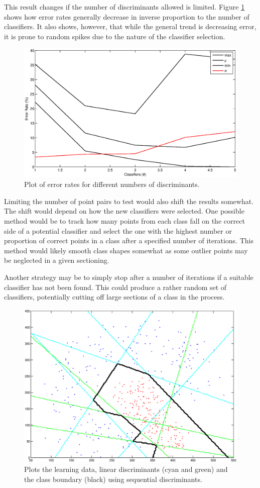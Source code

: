 This result changes if the number of discriminants allowed is limited. Figure
\ref{fig:error_rates} shows how error rates generally decrease in inverse
proportion to the number of classifiers. It also shows, however, that while the
general trend is decreasing error, it is prone to random spikes due to the
nature of the classifier selection.

\begin{figure}
\includegraphics[scale=0.6]{sequence_error_plots}
\caption{Plot of error rates for different numbers of discriminants.}
\label{fig:error_rates}
\end{figure}

Limiting the number of point pairs to test would also shift the results
somewhat. The shift would depend on how the new classifiers were selected. One
possible method would be to track how many points from each class fall on the
correct side of a potential classifier and select the one with the highest
number or proportion of correct points in a class after a specified number of
iterations. This method would likely smooth class shapes somewhat as some
outlier points may be neglected in a given sectioning.

Another strategy may be to simply stop after a number of iterations if a
suitable classifier has not been found. This could produce a rather random set
of classifiers, potentially cutting off large sections of a class in the
process.

\begin{figure}
\includegraphics[scale=0.5]{sequential_bounds}
\caption{Plots the learning data, linear discriminants (cyan and green) and the
class boundary (black) using sequential discriminants.}
\label{fig:sequential_bounds}
\end{figure}